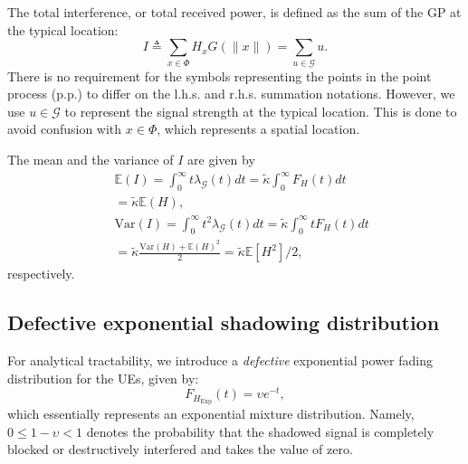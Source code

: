 \documentclass[lettersize,journal]{IEEEtran}
\begin{document}
The total interference, or total received power, is defined as the sum of the GP at the typical location:
\begin{equation}
  \label{eq:totpow}
  I \triangleq \sum_{x \in \Phi} H_x G(\|x\|) = \sum_{u \in \mathcal{G}} u.
\end{equation}
There is no requirement for the symbols representing the points in the point process (p.p.) to differ on the l.h.s. and r.h.s. summation notations. However, we use $u \in \mathcal{G}$ to represent the signal strength at the typical location. This is done to avoid confusion with $x \in \Phi$, which represents a spatial location.




The mean and the variance of $I$ are given by
\begin{align}
  \label{eq:totmean}
  &\mathbb{E}\left(I \right) = \int_{0}^{\infty} t\lambda_{\mathcal{G}}(t) dt = \tilde{\kappa} \int_{0}^{\infty}F_H(t) dt \nonumber \\
  &=\tilde{\kappa} \mathbb{E}(H), \\\
  \label{eq:totvar}
  &\text{Var}\left(I \right) = \int_{0}^{\infty} t^2\lambda_{\mathcal{G}}(t) dt= \tilde{\kappa} \int_0^{\infty}tF_H(t) dt  \nonumber \\
  &= \tilde{\kappa} \frac{\text{Var}(H) + \mathbb{E}(H)^2}{2} = \tilde{\kappa}  \mathbb{E}[H^2]/2,
\end{align}
respectively.







\subsection{Defective exponential shadowing distribution}

For analytical tractability, we introduce a \textit{defective} exponential power fading distribution for the UEs, given by:
\begin{equation}
  \label{eq:defexp}
  F_{{H}_{\text{Exp}}}(t) = \upsilon e^{-t},
\end{equation}
which essentially represents an exponential mixture distribution. Namely, $0 \leq 1-\upsilon < 1$ denotes the probability that the shadowed signal is completely blocked or destructively interfered and takes the value of zero.
\end{document}
